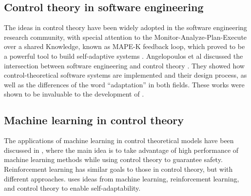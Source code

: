 

\subsection{Control theory in software engineering}

The ideas in control theory have been widely adopted in the software engineering research community, with special attention to the Monitor-Analyze-Plan-Execute over a shared Knowledge, known as MAPE-K feedback loop, which proved to be a powerful tool to build self-adaptive systems \cite{arcaini_modeling_2015, salehie_self-adaptive_2009, Brun2013, computing_architectural_2006, kephart_vision_2003, de_lemos_software_2013}. Angelopoulos et al discussed the intersection between software engineering and control theory \cite{filieri2015software}. They showed how control-theoretical software systems are implemented and their design process, as well as the differences of the word ``adaptation'' in both fields. These works were shown to be invaluable to the development of \projectname{}. 

\subsection{Machine learning in control theory}

The applications of machine learning in control theoretical models have been discussed in \cite{Gillula10_FusingMachineLearningControlTheory}, where the main idea is to take advantage of high performance of machine learning methods while using control theory to guarantee safety. Reinforcement learning \cite{Sutton:1998:IRL:551283} has similar goals to those in control theory, but with different approaches. \projectname{} uses ideas from machine learning, reinforcement learning, and control theory to enable self-adaptability. 

